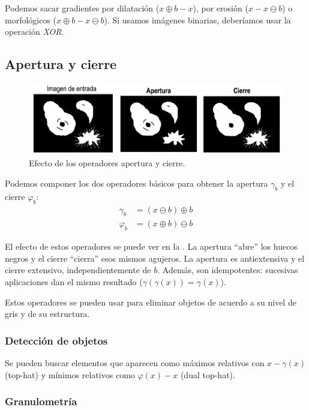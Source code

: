 \documentclass[nochap,palatino,notitlepage]{apuntes}
\begin{document}
Podemos sacar gradientes por dilatación ($x \oplus b - x$), por erosión ($x - x \ominus b$) o morfológicos ($x\oplus b - x \ominus b$). Si usamos imágenes binarias, deberíamos usar la operación \textit{XOR}.

\subsection{Apertura y cierre}

\begin{figure}[hbtp]
\centering
\includegraphics[width=\textwidth]{img/AperturaCierre.png}
\caption{Efecto de los operadores apertura y cierre.}
\label{fig:AperturaCierre}
\end{figure}

Podemos componer los dos operadores básicos para obtener la apertura $γ_b$ y el cierre $φ_b$: \begin{align*}
γ_b &= (x \ominus b) \oplus b \\
φ_b &= (x \oplus b) \ominus b
\end{align*}

El efecto de estos operadores se puede ver en la . La apertura ``abre'' los huecos negros y el cierre ``cierra'' esos mismos agujeros. La apertura es antiextensiva y el cierre extensivo, independientemente de $b$. Además, son idempotentes: sucesivas aplicaciones dan el mismo resultado ($γ(γ(x)) = γ(x)$).

Estos operadores se pueden usar para eliminar objetos de acuerdo a su nivel de gris y de su estructura.

\subsubsection{Detección de objetos}

Se pueden buscar elementos que aparecen como máximos relativos con $x - γ(x)$  (top-hat) y mínimos relativos como $φ(x) - x$ (dual top-hat).

\subsubsection{Granulometría}
\end{document}
